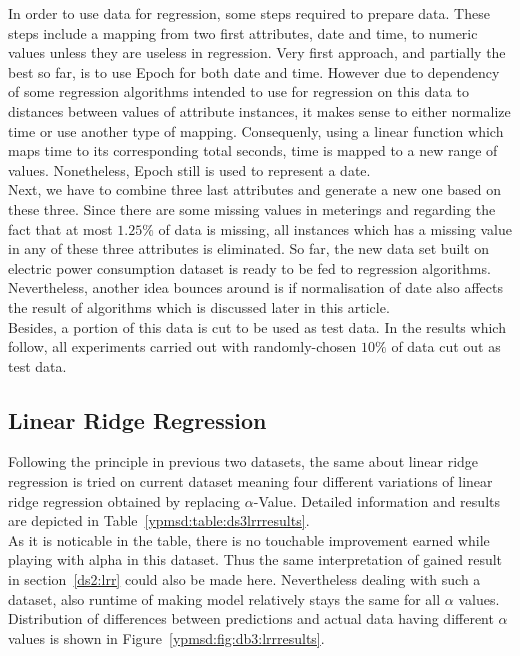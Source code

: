 In order to use data for regression, some steps required to prepare data. These
steps include a mapping from two first attributes, date and time, to numeric
values unless they are useless in regression. Very first approach, and partially
the best so far, is to use Epoch\cite{ritchie1971unix} for both date and time.
However due to dependency of some regression algorithms intended to use for
regression on this data to distances between values of attribute instances, it
makes sense to either normalize time or use another type of mapping.
Consequenly, using a linear function which maps time to its corresponding total
seconds, time is mapped to a new range of values. Nonetheless, Epoch still is
used to represent a date.\\
Next, we have to combine three last attributes and generate a new one based on
these three. Since there are some missing values in meterings and regarding the
fact that at most $1.25\%$ of data is missing, all instances which has a missing
value in any of these three attributes is eliminated. So far, the new data set
built on electric power consumption dataset is ready to be fed to regression
algorithms. \\
Nevertheless, another idea bounces around is if normalisation of
date also affects the result of algorithms which is discussed later in this
article.\\
Besides, a portion of this data is cut to be used as test data. In the results
which follow, all experiments carried out with randomly-chosen $10\%$ of data
cut out as test data.

\subsection{Linear Ridge Regression}

Following the principle in previous two datasets, the same about linear ridge
regression is tried on current dataset meaning four different variations of
linear ridge regression obtained by replacing $\alpha$-Value. Detailed
information and results are depicted in Table~\ref{ypmsd:table:ds3lrrresults}.
\\
As it is noticable in the table, there is no touchable improvement earned while
playing with alpha in this dataset. Thus the same interpretation of gained
result in section~\ref{ds2:lrr} could also be made here. Nevertheless dealing
with such a dataset, also runtime of making model relatively stays the same for all
$\alpha$ values. Distribution of differences between
predictions and actual data having different $\alpha$ values is shown in
Figure~\ref{ypmsd:fig:db3:lrrresults}.


